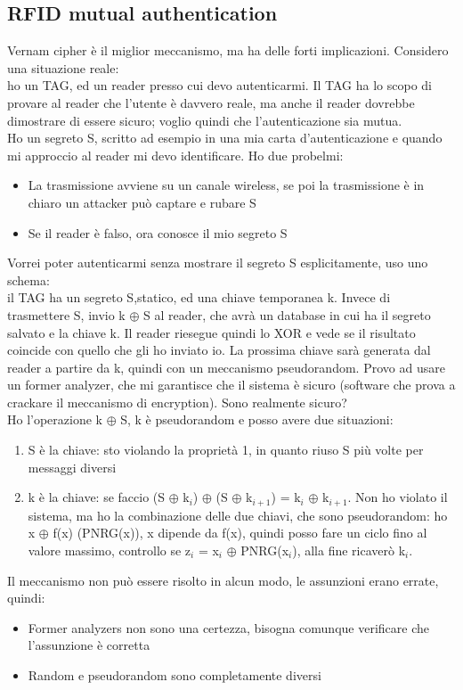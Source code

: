 \documentclass[16px]{article}
\begin{document}
\subsection{RFID mutual authentication}
Vernam cipher è il miglior meccanismo, ma ha delle forti implicazioni. Considero una situazione reale:\\ ho un TAG, ed un reader presso cui devo autenticarmi. Il TAG ha lo scopo di provare al reader che l'utente è davvero reale, ma anche il reader dovrebbe dimostrare di essere sicuro; voglio quindi che l'autenticazione sia mutua.\\ Ho un segreto S, scritto ad esempio in una mia carta d'autenticazione e quando mi approccio al reader mi devo identificare. Ho due probelmi:
\begin{itemize}
\item La trasmissione avviene su un canale wireless, se poi la trasmissione è in chiaro un attacker può captare e rubare S
\item Se il reader è falso, ora conosce il mio segreto S
\end{itemize}
Vorrei poter autenticarmi senza mostrare il segreto S esplicitamente, uso uno schema:\\ il TAG ha un segreto S,statico, ed una chiave temporanea k. Invece di trasmettere S, invio k $\oplus$ S al reader, che avrà un database in cui ha il segreto salvato e la chiave k. Il reader riesegue quindi lo XOR e vede se il risultato coincide con quello che gli ho inviato io. La prossima chiave sarà generata dal reader a partire da k, quindi con un meccanismo pseudorandom. Provo ad usare un former analyzer, che mi garantisce che il sistema è sicuro (software che prova a crackare il meccanismo di encryption). Sono realmente sicuro?\\ Ho l'operazione k $\oplus$ S, k è pseudorandom e posso avere due situazioni:
\begin{enumerate}
\item S è la chiave: sto violando la proprietà 1, in quanto riuso S più volte per messaggi diversi
\item k è la chiave: se faccio (S $\oplus$ k$_{i}$) $\oplus$ (S $\oplus$ k$_{i+1}$) = k$_{i}$ $\oplus$ k$_{i+1}$. Non ho violato il sistema, ma ho la combinazione delle due chiavi, che sono pseudorandom: ho x $\oplus$ f(x) (PNRG(x)), x dipende da f(x), quindi posso fare un ciclo fino al valore massimo, controllo se z$_{i}$ = x$_{i}$ $\oplus$ PNRG(x$_{i}$), alla fine ricaverò k$_{i}$.
\end{enumerate}
Il meccanismo non può essere risolto in alcun modo, le assunzioni erano errate, quindi:
\begin{itemize}
\item Former analyzers non sono una certezza, bisogna comunque verificare che l'assunzione è corretta
\item Random e pseudorandom sono completamente diversi
\end{itemize}
\end{document}
